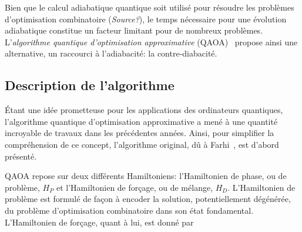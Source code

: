 Bien que le calcul adiabatique quantique soit utilisé pour résoudre les problèmes d'optimisation combinatoire (\textcolor{mydarkred}{\textit{Source?}}), le temps nécessaire pour une évolution adiabatique constitue un facteur limitant pour de nombreux problèmes. L'\textit{algorithme quantique d'optimisation approximative} (QAOA)~\cite{farhiQuantumApproximateOptimization2014} propose ainsi une alternative, un raccourci à l'adiabacité: la contre-diabacité.


\subsection{Description de l'algorithme}
\label{subsec:description-algorithme}

Étant une idée prometteuse pour les applications des ordinateurs quantiques, l'algorithme quantique d'optimisation approximative a mené à une quantité incroyable de travaux dans les précédentes années. Ainsi, pour simplifier la compréhension de ce concept, l'algorithme original, dû à Farhi~\cite{farhiQuantumApproximateOptimization2014}, est d'abord présenté.

QAOA repose sur deux différents Hamiltoniens: l'Hamiltonien de phase, ou de problème, $H_{P}$ et l'Hamiltonien de forçage, ou de mélange, $H_{D}$. L'Hamiltonien de problème est formulé de façon à encoder la solution, potentiellement dégénérée, du problème d'optimisation combinatoire dans son état fondamental. L'Hamiltonien de forçage, quant à lui, est donné par


